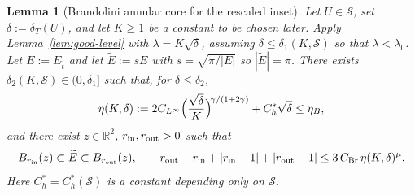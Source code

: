 \documentclass[11pt]{amsart}
\newtheorem{lemma}[theorem]{Lemma}
\newcommand{\R}{\mathbb R}
\newcommand{\Et}{E_{\hat t}}
\newcommand{\dT}{\delta_T}
\newcommand{\Etil}{\widetilde E}
\newcommand{\Sclass}{\mathcal S}
\begin{document}
\begin{lemma}[Brandolini annular core for the rescaled inset]
\label{lem:Brandolini-core}
Let \(U\in\Sclass\), set \(\delta:=\dT(U)\), and let \(K\ge1\) be a
constant to be chosen later.  Apply
Lemma~\ref{lem:good-level} with \(\lambda=K\sqrt\delta\), assuming
\(\delta\le\delta_1(K,\Sclass)\) so that
\(\lambda<\lambda_0\).  Let \(E:=\Et\) and let \(\Etil:=sE\) with
\(s=\sqrt{\pi/|E|}\) so \(|\Etil|=\pi\).  There exists
\(\delta_2(K,\Sclass)\in(0,\delta_1]\) such that, for
\(\delta\le\delta_2\),
\begin{equation}\label{eq:eta-explicit}
   \eta(K,\delta):=
   2C_{L^\infty}\Bigl(\frac{\sqrt\delta}{K}\Bigr)^{\!\gamma/(1+2\gamma)}
   +C_h^*\sqrt\delta\le\eta_B,
\end{equation}
and there exist \(z\in\R^2\), \(r_{\rm in},r_{\rm out}>0\) such that
\begin{equation}\label{eq:annular-core}
   B_{r_{\rm in}}(z)\subset \Etil\subset B_{r_{\rm out}}(z),
   \qquad
   r_{\rm out}-r_{\rm in}+|r_{\rm in}-1|+|r_{\rm out}-1|
   \le 3\,C_{\rm Br}\,\eta(K,\delta)^\mu.
\end{equation}
Here \(C_h^*=C_h^*(\Sclass)\) is a constant depending only on
\(\Sclass\).
\end{lemma}
\end{document}
